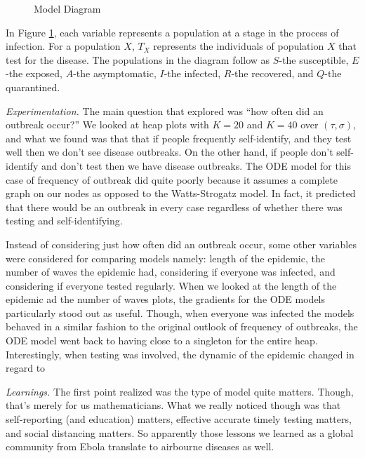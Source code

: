 \documentclass[12pt]{amsart}
\theoremstyle{definition}
\begin{document}
\begin{onehalfspace}
\begin{figure}
\begin{tikzpicture}
            \end{tikzpicture}
            \caption{Model Diagram}
            \label{Figure2}
        \end{figure}

        In Figure \ref{Figure2}, each variable represents a population at a stage in the process of infection.
        For a population $X$, $T_X$ represents the individuals of population $X$ that test for the disease.
        The populations in the diagram follow as $S$-the susceptible, $E$-the exposed, $A$-the asymptomatic,
        $I$-the infected, $R$-the recovered, and $Q$-the quarantined.

        \emph{Experimentation.} The main question that explored was ``how often did an outbreak occur?''
        We looked at heap plots with $K=20$ and $K=40$ over $(\tau,\sigma)$, and what we found was that that if people frequently
        self-identify, and they test well then we don't see disease outbreaks.
        On the other hand, if people don't self-identify and don't test then we have disease outbreaks.
        The ODE model for this case of frequency of outbreak did quite poorly because it assumes a complete graph
        on our nodes as opposed to the Watts-Strogatz model.
        In fact, it predicted that there would be an outbreak in every case regardless of whether there was
        testing and self-identifying.

        Instead of considering just how often did an outbreak occur, some other variables were considered for
        comparing models namely: length of the epidemic, the number of waves the epidemic had, considering if everyone
        was infected, and considering if everyone tested regularly.
        When we looked at the length of the epidemic ad the number of waves plots, the gradients for the ODE models
        particularly stood out as useful.
        Though, when everyone was infected the models behaved in a similar fashion to the original outlook of
        frequency of outbreaks, the ODE model went back to having close to a singleton for the entire heap.
        Interestingly, when testing was involved, the dynamic of the epidemic changed in regard to

        \emph{Learnings.} The first point realized was the type of model quite matters.
        Though, that's merely for us mathematicians.
        What we really noticed though was that self-reporting (and education) matters, effective accurate timely testing
        matters, and social distancing matters.
        So apparently those lessons we learned as a global community from Ebola translate to airbourne diseases as well.


\end{onehalfspace}
\end{document}
